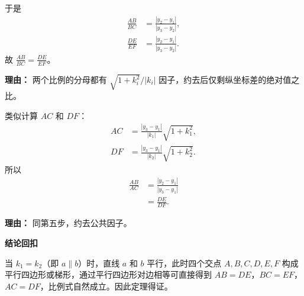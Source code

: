 \begin{proofbox}
\begin{description}[style=nextline, leftmargin=2.8em, labelsep=0.5em, itemsep=0.55em]
		\item[\textbf{步骤五（求比例）：}] 于是
			\[
				\begin{aligned}
					\frac{AB}{BC} &= \frac{|y_2-y_1|}{|y_3-y_2|},\\    \frac{DE}{EF} &= \frac{|y_2-y_1|}{|y_3-y_2|}.
			\end{aligned}
			\]
			故 $\displaystyle\frac{AB}{BC} = \frac{DE}{EF}$。
			\par\textbf{理由：}
			两个比例的分母都有 $\sqrt{1+k_i^2}/|k_i|$ 因子，约去后仅剩纵坐标差的绝对值之比。

		\item[\textbf{步骤六（证另一比例）：}] 类似计算 $AC$ 和 $DF$：
			\[
				\begin{aligned}
					AC &= \frac{|y_3-y_1|}{|k_1|}\sqrt{1+k_1^2},\\    DF &= \frac{|y_3-y_1|}{|k_2|}\sqrt{1+k_2^2}.
			\end{aligned}
			\]
			所以
			\[
				\begin{aligned}
					\frac{AB}{AC} &= \frac{|y_2-y_1|}{|y_3-y_1|} \\    &= \frac{DE}{DF}.
			\end{aligned}
			\]
			\par\textbf{理由：}
			同第五步，约去公共因子。
	\end{description}

	\medskip
	\textbf{\textcolor{CProof}{结论回扣}}

	当 $k_1=k_2$（即 $a\parallel b$）时，直线 $a$ 和 $b$ 平行，此时四个交点 $A,B,C,D,E,F$ 构成平行四边形或梯形，通过平行四边形对边相等可直接得到 $AB=DE$，$BC=EF$，$AC=DF$，比例式自然成立。因此定理得证。
\end{proofbox}
